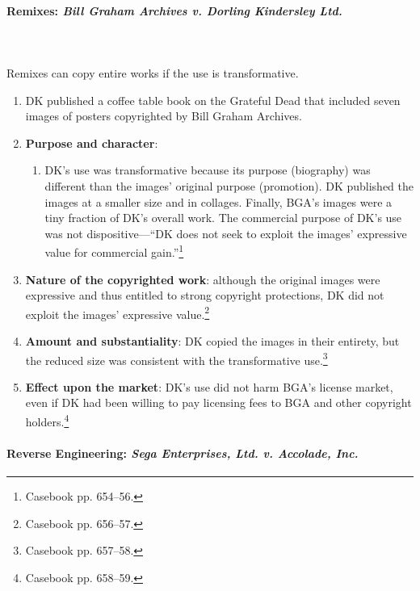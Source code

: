 \paragraph{Remixes: \emph{Bill Graham Archives v. Dorling Kindersley Ltd.}}
~\\\\
Remixes can copy entire works if the use is transformative.

\begin{enumerate}
    \item DK published a coffee table book on the Grateful Dead that included 
    seven images of posters copyrighted by Bill Graham Archives.
    \item \textbf{Purpose and character}:
    \begin{enumerate}
        \item DK's use was transformative because its purpose (biography) was 
        different than the images' original purpose (promotion). DK published 
        the images at a smaller size and in collages. Finally, BGA's images 
        were a tiny fraction of DK's overall work. The commercial purpose of 
        DK's use was not dispositive---``DK does not seek to exploit the 
        images' expressive value for commercial gain.''\footnote{Casebook pp. 
        654--56.}
    \end{enumerate}
    \item \textbf{Nature of the copyrighted work}: although the original 
    images were expressive and thus entitled to strong copyright protections, 
    DK did not exploit the images' expressive value.\footnote{Casebook pp. 
    656--57.}
    \item \textbf{Amount and substantiality}: DK copied the images in their 
    entirety, but the reduced size was consistent with the transformative 
    use.\footnote{Casebook pp. 657--58.}
    \item \textbf{Effect upon the market}: DK's use did not harm BGA's license 
    market, even if DK had been willing to pay licensing fees to BGA and other 
    copyright holders.\footnote{Casebook pp. 658--59.}
\end{enumerate}

\paragraph{Reverse Engineering: \emph{Sega Enterprises, Ltd. v. Accolade, Inc.}}

